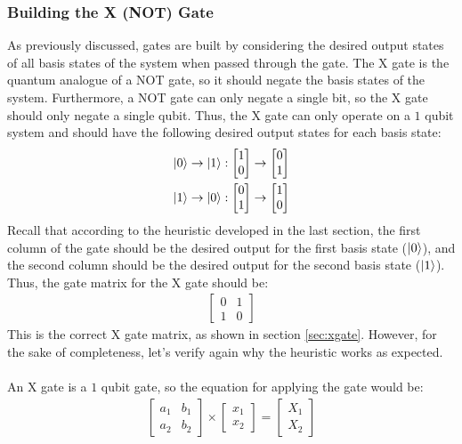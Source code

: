 \documentclass{article}
\begin{document}
\subsubsection{Building the X (NOT) Gate}
\label{sec:buildingxgate}
As previously discussed, gates are built by considering the desired output states of all basis states of the system when passed through the gate.
The X gate is the quantum analogue of a NOT gate, so it should negate the basis states of the system.
Furthermore, a NOT gate can only negate a single bit, so the X gate should only negate a single qubit.
Thus, the X gate can only operate on a $1$ qubit system and should have the following desired output states for each basis state:
\begin{align*}
	\ket{0} \rightarrow \ket{1} :
	\begin{bmatrix}
		1 \\
		0
	\end{bmatrix}
	\rightarrow
	\begin{bmatrix}
		0 \\
		1
	\end{bmatrix}
	\\
	\ket{1} \rightarrow \ket{0} :
	\begin{bmatrix}
		0 \\
		1
	\end{bmatrix}
	\rightarrow
	\begin{bmatrix}
		1 \\
		0
	\end{bmatrix}
\end{align*}
Recall that according to the heuristic developed in the last section, the first column of the gate should be the desired output for the first basis state
($\ket{0}$), and the second column should be the desired output for the second basis state ($\ket{1}$).
Thus, the gate matrix for the X gate should be:
\begin{align*}
	\begin{bmatrix}
		0 & 1 \\
		1 & 0
	\end{bmatrix}
\end{align*}
This is the correct X gate matrix, as shown in section \ref{sec:xgate}.
However, for the sake of completeness, let's verify again why the heuristic works as expected. \\\\
An X gate is a $1$ qubit gate, so the equation for applying the gate would be:
\begin{align*}
	\begin{bmatrix}
		a_{1} & b_{1} \\
		a_{2} & b_{2}
	\end{bmatrix}
	\times
	\begin{bmatrix}
		x_{1} \\
		x_{2}
	\end{bmatrix}
	=
	\begin{bmatrix}
		X_{1} \\
		X_{2}
	\end{bmatrix}
\end{align*}
\end{document}
